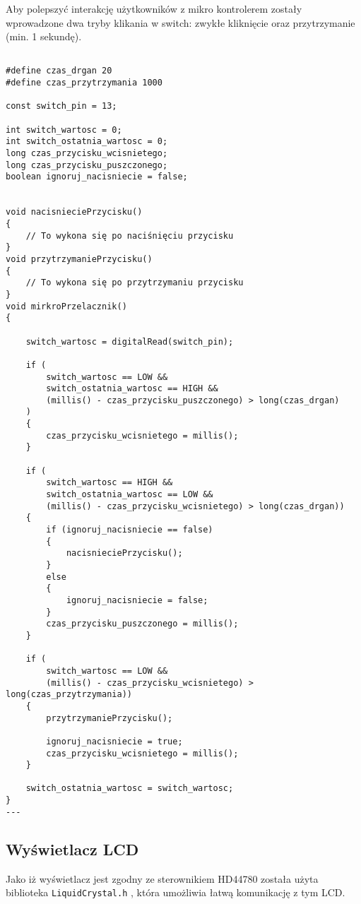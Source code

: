 Aby polepszyć interakcję użytkowników z mikro kontrolerem zostały wprowadzone dwa tryby klikania w switch: zwykłe kliknięcie oraz przytrzymanie (min. 1 sekundę).

\begin{lstlisting}[label=list:code_switch,caption=Obsługa mikroprzełacznika,
basicstyle=\footnotesize\ttfamily]

#define czas_drgan 20
#define czas_przytrzymania 1000

const switch_pin = 13;

int switch_wartosc = 0;
int switch_ostatnia_wartosc = 0;
long czas_przycisku_wcisnietego;
long czas_przycisku_puszczonego;
boolean ignoruj_nacisniecie = false; 


void nacisnieciePrzycisku()
{
    // To wykona się po naciśnięciu przycisku
}
void przytrzymaniePrzycisku()
{
    // To wykona się po przytrzymaniu przycisku
}
void mirkroPrzelacznik()
{

	switch_wartosc = digitalRead(switch_pin);

    if (
        switch_wartosc == LOW && 
        switch_ostatnia_wartosc == HIGH && 
        (millis() - czas_przycisku_puszczonego) > long(czas_drgan)
    )
    {
    	czas_przycisku_wcisnietego = millis();
    }
    
    if (
        switch_wartosc == HIGH &&
        switch_ostatnia_wartosc == LOW &&
        (millis() - czas_przycisku_wcisnietego) > long(czas_drgan))
    {
    	if (ignoruj_nacisniecie == false)
    	{
    		nacisnieciePrzycisku();
    	}
    	else
    	{
    	    ignoruj_nacisniecie = false;
    	}
    	czas_przycisku_puszczonego = millis();
    }
    
    if (
        switch_wartosc == LOW &&
        (millis() - czas_przycisku_wcisnietego) > long(czas_przytrzymania))
    {
    	przytrzymaniePrzycisku();
    
    	ignoruj_nacisniecie = true;
    	czas_przycisku_wcisnietego = millis();
    }
    
    switch_ostatnia_wartosc = switch_wartosc;
}
---
\end{lstlisting}

\subsection{Wyświetlacz LCD}

Jako iż wyświetlacz jest zgodny ze sterownikiem HD44780 została użyta biblioteka \texttt{LiquidCrystal.h} \cite{lib_lcd}, która umożliwia łatwą komunikację z tym LCD.

